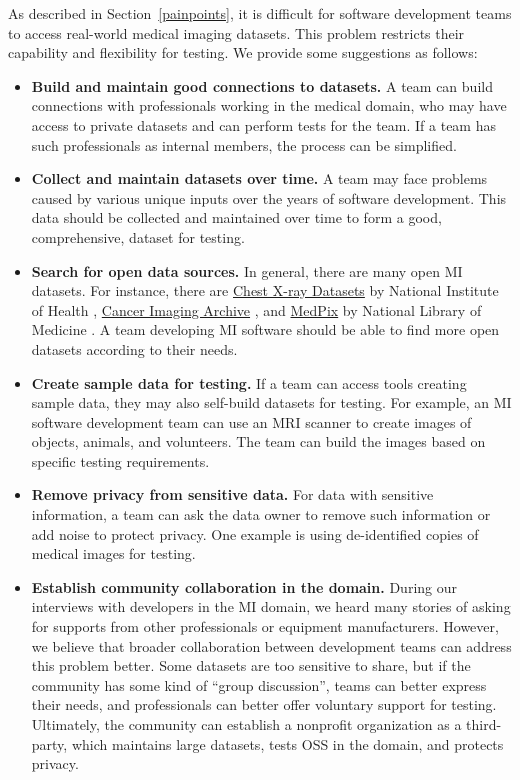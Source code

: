 \documentclass[final, 3p, times, authoryear]{elsarticle}
\begin{document}
As described in Section~\ref{painpoints}, it is difficult for software
development teams to access real-world medical imaging datasets. This problem
restricts their capability and flexibility for testing. We provide some
suggestions as follows:

\begin{itemize}
\item \textbf{Build and maintain good connections to datasets.} A team can build
connections with professionals working in the medical domain, who may have
access to private datasets and can perform tests for the team. If a team has
such professionals as internal members, the process can be simplified.

\item \textbf{Collect and maintain datasets over time.} A team may face problems
caused by various unique inputs over the years of software development. This
data should be collected and maintained over time to form a good, comprehensive,
dataset for testing.

\item \textbf{Search for open data sources.} In general, there are many open MI
datasets.  For instance, there are
\href{https://nihcc.app.box.com/v/ChestXray-NIHCC}{Chest X-ray Datasets} by
National Institute of Health \citep{WangEtAl2017},
\href{https://www.cancerimagingarchive.net/}{Cancer Imaging Archive}
\citep{PriorEtAl2017}, and \href{https://medpix.nlm.nih.gov/home}{MedPix} by
National Library of Medicine \citep{Smirniotopoulos2014}. A team developing MI
software should be able to find more open datasets according to their needs.

\item \textbf{Create sample data for testing.} If a team can access tools
creating sample data, they may also self-build datasets for testing. For
example, an MI software development team can use an MRI scanner to create images
of objects, animals, and volunteers. The team can build the images based on
specific testing requirements.

\item \textbf{Remove privacy from sensitive data.} For data with sensitive
information, a team can ask the data owner to remove such information or add
noise to protect privacy. One example is using de-identified copies of medical
images for testing.

\item \textbf{Establish community collaboration in the domain.} During our
interviews with developers in the MI domain, we heard many stories of asking for
supports from other professionals or equipment manufacturers. However, we
believe that broader collaboration between development teams can address this
problem better. Some datasets are too sensitive to share, but if the community
has some kind of ``group discussion'', teams can better express their needs, and
professionals can better offer voluntary support for testing. Ultimately, the
community can establish a nonprofit organization as a third-party, which
maintains large datasets, tests OSS in the domain, and protects privacy. 

\end{itemize}
\end{document}
